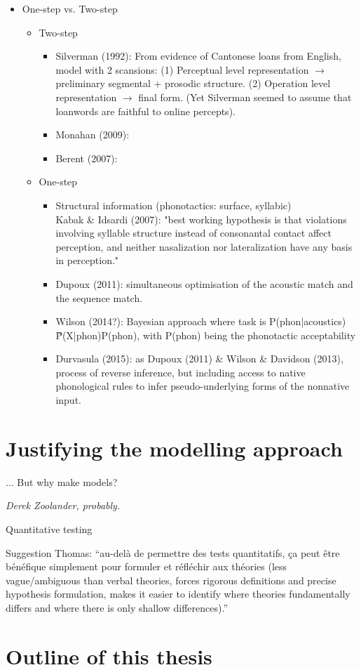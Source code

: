 \begin{itemize}
\item One-step vs. Two-step
  \begin{itemize}
  \item Two-step
      \begin{itemize}
        \item Silverman (1992): From evidence of Cantonese loans from English, model with 2 scansions: (1) Perceptual level representation $\rightarrow$ preliminary segmental + prosodic structure. (2) Operation level representation $\rightarrow$ final form. (Yet Silverman seemed to assume that loanwords are faithful to online percepts).
        \item Monahan (2009):
        \item Berent (2007): 
      \end{itemize}
  \item One-step
      \begin{itemize}
      \item Structural information (phonotactics: surface, syllabic) \\
  Kabak \& Idsardi (2007): "best working hypothesis is that violations involving syllable structure instead of consonantal contact affect perception, and neither nasalization nor lateralization have any basis in perception."
         \item Dupoux (2011): simultaneous optimisation of the acoustic match and the sequence match.
         \item Wilson (2014?): Bayesian approach where task is P(phon|acoustics) \~ P(X|phon)P(phon), with P(phon) being the phonotactic acceptability 
         \item Durvasula (2015): as Dupoux (2011) \& Wilson \& Davidson (2013), process of reverse inference, but including access to native phonological rules to infer pseudo-underlying forms of the nonnative input.
      \end{itemize}  
  \end{itemize}
\end{itemize}

\section{Justifying the modelling approach}
\epigraph{... But why make models?}{\textit{Derek Zoolander, probably.}}
Quantitative testing $~$

Suggestion Thomas: ``au-delà de permettre des tests quantitatifs, ça peut être bénéfique simplement pour formuler et réfléchir aux théories (less vague/ambiguous than verbal theories, forces rigorous definitions and precise hypothesis formulation, makes it easier to identify where theories fundamentally differs and where there is only shallow differences).''
\section{Outline of this thesis}





